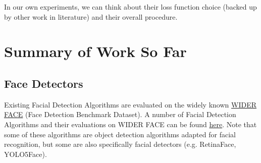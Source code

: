 \documentclass[12pt]{amsart}
\begin{document}
\begin{discussion*}
In our own experiments, we can think about their loss function choice (backed up by other work in literature) and their overall procedure.
\end{discussion*}


\newpage

\section{Summary of Work So Far}

\subsection{Face Detectors}

Existing Facial Detection Algorithms are evaluated on the widely known \href{http://shuoyang1213.me/WIDERFACE/index.html}
{WIDER FACE} (Face Detection Benchmark Dataset). A number of Facial Detection Algorithms and their evaluations on WIDER FACE can be found \href{http://shuoyang1213.me/WIDERFACE/WiderFace_Results.html}{here}. Note that some of these algorithms are object detection algorithms adapted for facial recognition, but some are also specifically facial detectors (e.g. RetinaFace, YOLO5Face).
\end{document}
